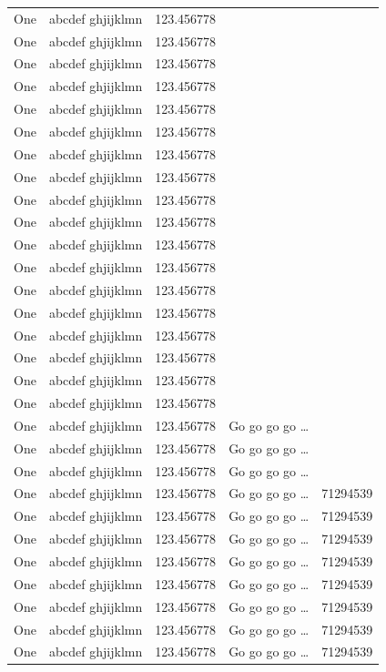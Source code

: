 \documentclass[phd]{ndsu-thesis-2022}
\begin{document}
\begin{longtable}{l l l l r}
One & abcdef ghjijklmn & 123.456778 \\
One & abcdef ghjijklmn & 123.456778 \\
One & abcdef ghjijklmn & 123.456778 \\
One & abcdef ghjijklmn & 123.456778 \\
One & abcdef ghjijklmn & 123.456778 \\
One & abcdef ghjijklmn & 123.456778 \\
One & abcdef ghjijklmn & 123.456778 \\
One & abcdef ghjijklmn & 123.456778 \\
One & abcdef ghjijklmn & 123.456778 \\
One & abcdef ghjijklmn & 123.456778 \\
One & abcdef ghjijklmn & 123.456778 \\
One & abcdef ghjijklmn & 123.456778 \\
One & abcdef ghjijklmn & 123.456778 \\
One & abcdef ghjijklmn & 123.456778 \\
One & abcdef ghjijklmn & 123.456778 \\
One & abcdef ghjijklmn & 123.456778 \\
One & abcdef ghjijklmn & 123.456778 \\
One & abcdef ghjijklmn & 123.456778 \\
One & abcdef ghjijklmn & 123.456778  & Go go go go \ldots \\
One & abcdef ghjijklmn & 123.456778  & Go go go go \ldots \\
One & abcdef ghjijklmn & 123.456778  & Go go go go \ldots \\
One & abcdef ghjijklmn & 123.456778  & Go go go go \ldots & \num{71294539}\\
One & abcdef ghjijklmn & 123.456778  & Go go go go \ldots & \num{71294539}\\
One & abcdef ghjijklmn & 123.456778  & Go go go go \ldots & \num{71294539}\\
One & abcdef ghjijklmn & 123.456778  & Go go go go \ldots & \num{71294539}\\
One & abcdef ghjijklmn & 123.456778  & Go go go go \ldots & \num{71294539}\\
One & abcdef ghjijklmn & 123.456778  & Go go go go \ldots & \num{71294539}\\
One & abcdef ghjijklmn & 123.456778  & Go go go go \ldots & \num{71294539}\\
One & abcdef ghjijklmn & 123.456778  & Go go go go \ldots & \num{71294539}\\

\end{longtable}
\end{document}
